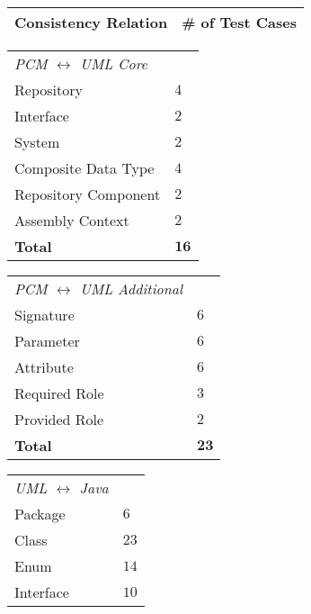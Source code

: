 \begin{table}
    \centering
    \small
    \renewcommand{\arraystretch}{1.2}
    \begin{tabular}{L{13em}C{8em}}
        \toprule
        \textbf{Consistency Relation} & \textbf{\# of Test Cases} \\
        \midrule
    \end{tabular}
    \begin{tabular}{L{13em}C{8em}}
        \textit{\gls{PCM} $\leftrightarrow$ \gls{UML} Core}\\\addlinespace[0.3em]
        Repository              & $4$ \\
        Interface               & $2$ \\
        System                  & $2$ \\
        Composite Data Type     & $4$ \\
        Repository Component    & $2$ \\
        Assembly Context        & $2$ \\%
        \textbf{Total}          & $\mathbf{16}$ \\
        \midrule
    \end{tabular}
    \begin{tabular}{L{13em}C{8em}}
        \textit{\gls{PCM} $\leftrightarrow$ \gls{UML} Additional}\\\addlinespace[0.3em]
        Signature       & $6$ \\
        Parameter       & $6$ \\
        Attribute       & $6$ \\
        Required Role   & $3$ \\
        Provided Role   & $2$ \\%
        \textbf{Total}  & $\mathbf{23}$ \\
        \midrule
    \end{tabular}
    \begin{tabular}{L{13em}C{8em}}
        \textit{\gls{UML} $\leftrightarrow$ Java} \\\addlinespace[0.3em]
        Package                     & $6$ \\
        Class                       & $23$ \\
        Enum                        & $14$ \\
        Interface                   & $10$ \\

\end{tabular}
\end{table}
